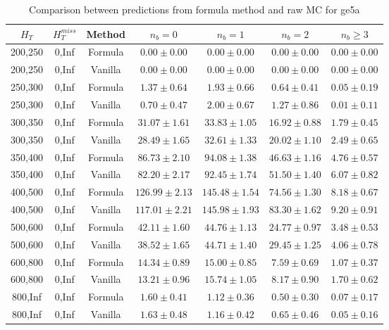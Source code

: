 \begin{longtable}{ | c | c | c | c | c | c | c | }
\caption{Comparison between predictions from formula method and raw MC for ge5a} \label{tab:formula-ge5a} \\    \hline 
$H_{T}$ & $H_{T}^{miss}$ & Method & $n_{b} = 0$ & $n_{b} = 1$ & $n_{b} = 2$ & $n_{b} \ge 3$ \\ \hline200,250 & 0,Inf & Formula  & $     0.00 \pm  0.00 $ & $     0.00 \pm  0.00 $ & $     0.00 \pm  0.00 $ & $     0.00 \pm  0.00 $  \\  
200,250 & 0,Inf & Vanilla  & $     0.00 \pm  0.00 $ & $     0.00 \pm  0.00 $ & $     0.00 \pm  0.00 $ & $     0.00 \pm  0.00 $  \\ \hline 
250,300 & 0,Inf & Formula  & $     1.37 \pm  0.64 $ & $     1.93 \pm  0.66 $ & $     0.64 \pm  0.41 $ & $     0.05 \pm  0.19 $  \\  
250,300 & 0,Inf & Vanilla  & $     0.70 \pm  0.47 $ & $     2.00 \pm  0.67 $ & $     1.27 \pm  0.86 $ & $     0.01 \pm  0.11 $  \\ \hline 
300,350 & 0,Inf & Formula  & $    31.07 \pm  1.61 $ & $    33.83 \pm  1.05 $ & $    16.92 \pm  0.88 $ & $     1.79 \pm  0.45 $  \\  
300,350 & 0,Inf & Vanilla  & $    28.49 \pm  1.65 $ & $    32.61 \pm  1.33 $ & $    20.02 \pm  1.10 $ & $     2.49 \pm  0.65 $  \\ \hline 
350,400 & 0,Inf & Formula  & $    86.73 \pm  2.10 $ & $    94.08 \pm  1.38 $ & $    46.63 \pm  1.16 $ & $     4.76 \pm  0.57 $  \\  
350,400 & 0,Inf & Vanilla  & $    82.20 \pm  2.17 $ & $    92.45 \pm  1.74 $ & $    51.50 \pm  1.40 $ & $     6.07 \pm  0.82 $  \\ \hline 
400,500 & 0,Inf & Formula  & $   126.99 \pm  2.13 $ & $   145.48 \pm  1.54 $ & $    74.56 \pm  1.30 $ & $     8.18 \pm  0.67 $  \\  
400,500 & 0,Inf & Vanilla  & $   117.01 \pm  2.21 $ & $   145.98 \pm  1.93 $ & $    83.30 \pm  1.62 $ & $     9.20 \pm  0.91 $  \\ \hline 
500,600 & 0,Inf & Formula  & $    42.11 \pm  1.60 $ & $    44.76 \pm  1.13 $ & $    24.77 \pm  0.97 $ & $     3.48 \pm  0.53 $  \\  
500,600 & 0,Inf & Vanilla  & $    38.52 \pm  1.65 $ & $    44.71 \pm  1.40 $ & $    29.45 \pm  1.25 $ & $     4.06 \pm  0.78 $  \\ \hline 
600,800 & 0,Inf & Formula  & $    14.34 \pm  0.89 $ & $    15.00 \pm  0.85 $ & $     7.59 \pm  0.69 $ & $     1.07 \pm  0.37 $  \\  
600,800 & 0,Inf & Vanilla  & $    13.21 \pm  0.96 $ & $    15.74 \pm  1.05 $ & $     8.17 \pm  0.90 $ & $     1.70 \pm  0.62 $  \\ \hline 
800,Inf & 0,Inf & Formula  & $     1.60 \pm  0.41 $ & $     1.12 \pm  0.36 $ & $     0.50 \pm  0.30 $ & $     0.07 \pm  0.17 $  \\  
800,Inf & 0,Inf & Vanilla  & $     1.63 \pm  0.48 $ & $     1.16 \pm  0.42 $ & $     0.65 \pm  0.46 $ & $     0.05 \pm  0.16 $  \\ \hline 
    \hline 
    \hline 
\end{longtable}


